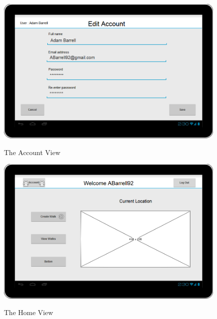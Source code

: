 \documentclass[11pt,a4paper]{article}
\begin{document}
\begin{figure}[H]
\begin{center}
\includegraphics[scale=0.5]{account.png}
\label{fig:accountView}
\caption{The Account View}
\end{center}
\end{figure}

\begin{figure}[H]
\begin{center}
\includegraphics[scale=0.5]{HomeView.png}
\label{fig:homeView}
\caption{The Home View}
\end{center}
\end{figure}
\end{document}
